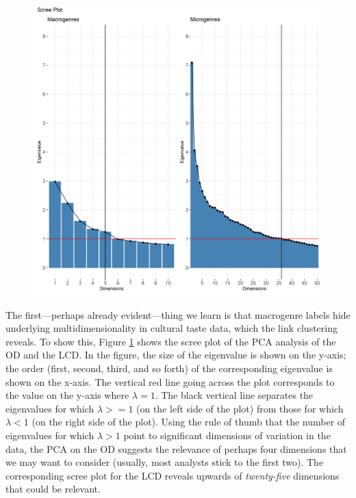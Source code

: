 \documentclass[a4paper,12pt]{extarticle}
\begin{document}
\begin{figure}[ht!]
    \includegraphics[width=1.0\textwidth]{Figs/Link Clust/macro-v-micro-pca-eig.png}
    \caption{}
    \label{fig:eig}
 \end{figure}

The first---perhaps already evident---thing we learn is that macrogenre labels hide underlying multidimensionality in cultural taste data, which the link clustering reveals. To show this, Figure \ref{fig:eig} shows the scree plot of the PCA analysis of the OD and the LCD. In the figure, the size of the eigenvalue is shown on the y-axis; the order (first, second, third, and so forth) of the corresponding eigenvalue is shown on the x-axis. The vertical red line going across the plot corresponds to the value on the y-axis where $\lambda = 1$. The black vertical line separates the eigenvalues for which $\lambda >= 1$ (on the left side of the plot) from those for which $\lambda < 1$ (on the right side of the plot). Using the rule of thumb that the number of eigenvalues for which $\lambda > 1$ point to significant dimensions of variation in the data, the PCA on the OD suggests the relevance of perhaps four dimensions that we may want to consider (usually, most analysts stick to the first two). The corresponding scree plot for the LCD reveals upwards of {\em twenty-five} dimensions that could be relevant. 
\end{document}
